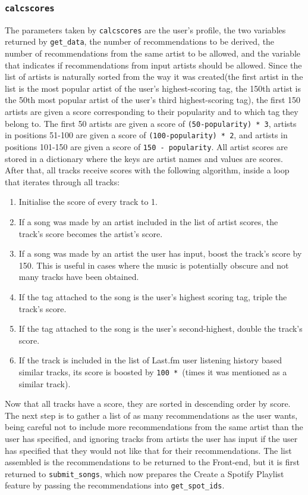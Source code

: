 \documentclass{l4proj}
\begin{document}
\subsubsection{\texttt{calcscores}}
The parameters taken by \texttt{calcscores} are the user's profile, the two variables returned by \texttt{get\_data}, the number of recommendations to be derived, the number of recommendations from the same artist to be allowed, and the variable that indicates if recommendations from input artists should be allowed. Since the list of artists is naturally sorted from the way it was created(the first artist in the list is the most popular artist of the user's highest-scoring tag, the 150th artist is the 50th most popular artist of the user's third highest-scoring tag), the first 150 artists are given a score corresponding to their popularity and to which tag they belong to. The first 50 artists are given a score of \texttt{(50-popularity) * 3}, artists in positions 51-100 are given a score of \texttt{(100-popularity) * 2}, and artists in positions 101-150 are given a score of \texttt{150 - popularity}. All artist scores are stored in a dictionary where the keys are artist names and values are scores. After that, all tracks receive scores with the following algorithm, inside a loop that iterates through all tracks: 
\begin{enumerate}
    \item Initialise the score of every track to 1.
    \item If a song was made by an artist included in the list of artist scores, the track's score becomes the artist's score.
    \item If a song was made by an artist the user has input, boost the track's score by 150. This is useful in cases where the music is potentially obscure and not many tracks have been obtained.
    \item If the tag attached to the song is the user's highest scoring tag, triple the track's score.
    \item If the tag attached to the song is the user's second-highest, double the track's score.
    \item If the track is included in the list of Last.fm user listening history based similar tracks, its score is boosted by \texttt{100 * }(times it was mentioned as a similar track).
\end{enumerate}
Now that all tracks have a score, they are sorted in descending order by score. The next step is to gather a list of as many recommendations as the user wants, being careful not to include more recommendations from the same artist than the user has specified, and ignoring tracks from artists the user has input if the user has specified that they would not like that for their recommendations. The list assembled is the recommendations to be returned to the Front-end, but it is first returned to \texttt{submit\_songs}, which now prepares the Create a Spotify Playlist feature by passing the recommendations into \texttt{get\_spot\_ids}.
\end{document}
